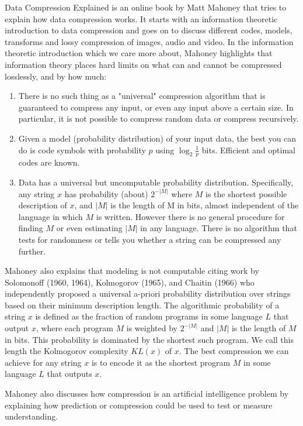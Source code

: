 \documentclass[12pt]{article}
\begin{document}
Data Compression Explained is an online book by Matt Mahoney that tries to explain how data compression works. It starts with an information theoretic introduction to data compression and goes on to discuss different codes, models, transforms and lossy compression of images, audio and video. In the information theoretic introduction which we care more about, Mahoney highlights that information theory places hard limits on what can and cannot be compressed losslessly, and by how much:
\begin{enumerate}
\item There is no such thing as a "universal" compression algorithm that is guaranteed to compress any input, or even any input above a certain size. In particular, it is not possible to compress random data or compress recursively.
\item Given a model (probability distribution) of your input data, the best you can do is code symbols with probability $p$ using $\log_2 \frac{1}{p}$ bits. Efficient and optimal codes are known.
\item Data has a universal but uncomputable probability distribution. Specifically, any string $x$ has probability (about) $2^{-|M|}$ where $M$ is the shortest possible description of $x$, and $|M|$ is the length of M in bits, almost independent of the language in which $M$ is written. However there is no general procedure for finding $M$ or even estimating $|M|$ in any language. There is no algorithm that tests for randomness or tells you whether a string can be compressed any further.
\end{enumerate}

Mahoney also explains that modeling is not computable citing work by Solomonoff (1960, 1964), Kolmogorov (1965), and Chaitin (1966) who independently proposed a universal a-priori probability distribution over strings based on their minimum description length. The algorithmic probability of a string $x$ is defined as the fraction of random programs in some language $L$ that output $x$, where each program $M$ is weighted by $2^{-|M|}$ and $|M|$ is the length of $M$ in bits. This probability is dominated by the shortest such program. We call this length the Kolmogorov complexity $KL(x)$ of $x$.
The best compression we can achieve for any string $x$ is to encode it as the shortest program $M$ in some language $L$ that outputs $x$.

Mahoney also discusses how compression is an artificial intelligence problem by explaining how prediction or compression could be used to test or measure understanding.
\end{document}
